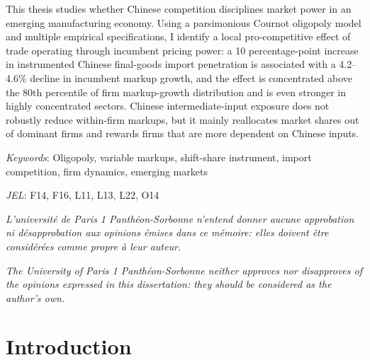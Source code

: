 \documentclass[12pt]{article}
\begin{document}
\begin{titlepage}
\begin{center}
\begin{minipage}{0.94\textwidth}
\smallskip

This thesis studies whether Chinese competition disciplines market power in an emerging manufacturing economy. Using a parsimonious Cournot oligopoly model and multiple empirical specifications, I identify a local pro-competitive effect of trade operating through incumbent pricing power: a 10 percentage-point increase in instrumented Chinese final-goods import penetration is associated with a 4.2--4.6\% decline in incumbent markup growth, and the effect is concentrated above the 80th percentile of firm markup-growth distribution and is even stronger in highly concentrated sectors. Chinese intermediate-input exposure does not robustly reduce within-firm markups, but it mainly reallocates market shares out of dominant firms and rewards firms that are more dependent on Chinese inputs.

\smallskip
\textit{Keywords}: Oligopoly, variable markups, shift-share instrument, import competition, firm dynamics, emerging markets

\smallskip
\textit{JEL}: F14, F16, L11, L13, L22, O14
\end{minipage}
\end{center}
\endgroup
\end{titlepage}

\newpage
\thispagestyle{empty}
\begin{center}
\bigskip\vspace*{6in}

\textit{L'universit\'{e} de Paris 1 Panth\'{e}on-Sorbonne n'entend donner aucune approbation
ni d\'{e}sapprobation aux opinions \'{e}mises dans ce m\'{e}moire: elles doivent \^{e}tre consid\'{e}r\'{e}es comme propre \`{a} leur auteur.}

\bigskip\vspace*{0.25in}

\textit{The University of Paris 1 Panth\'{e}on-Sorbonne neither approves nor
disapproves of the opinions expressed in this dissertation: they should be
considered as the author's own.}
\end{center}

\pagebreak%
\tableofcontents
\pagebreak%
\listoffigures
\pagebreak%
\listoftables
\pagebreak%
\onehalfspacing
\hypersetup{pageanchor=true}

\section{Introduction}
\end{document}
